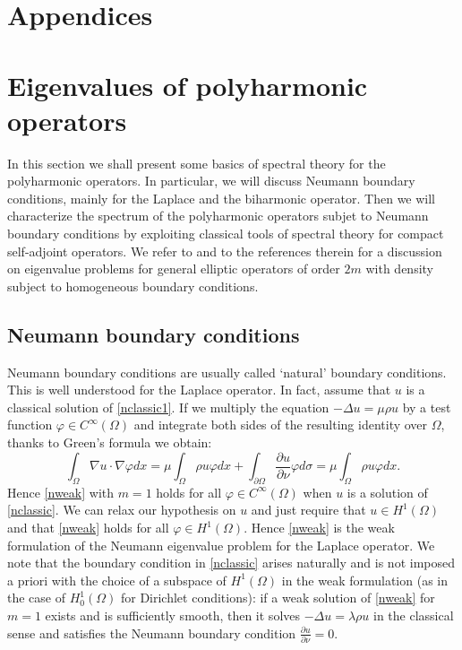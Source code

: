 \documentclass[11pt,a4paper]{amsart}
\numberwithin{equation}{section}
\begin{document}
\appendix
{}
\section*{Appendices}%






\section{Eigenvalues of polyharmonic operators}%

In this section we shall present some basics of spectral theory for the polyharmonic operators. In particular, we will discuss Neumann boundary conditions, mainly for the Laplace and the biharmonic operator. Then we will characterize the spectrum of the polyharmonic operators subjet to Neumann boundary conditions by exploiting classical tools of spectral theory for compact self-adjoint operators. We refer to \cite{egorov,laproeurasian} and to the references therein for a discussion on eigenvalue problems for general elliptic operators of order $2m$ with density subject to homogeneous boundary conditions. 

\subsection{Neumann boundary conditions}\label{app:neumann}
Neumann boundary conditions are usually called `natural' boundary conditions. This is well understood for the Laplace operator. In fact, assume that $u$ is a classical solution of \eqref{nclassic1}. If we multiply the equation $-\Delta u=\mu\rho u$ by a test function $\varphi\in C^{\infty}(\Omega)$ and integrate both sides of the resulting identity over $\Omega$, thanks to Green's formula we obtain:
$$
\int_{\Omega}\nabla u\cdot\nabla\varphi dx=\mu\int_{\Omega}\rho u\varphi dx+\int_{\partial\Omega}\frac{\partial u}{\partial\nu}\varphi d\sigma=\mu\int_{\Omega}\rho u\varphi dx.
$$
Hence \eqref{nweak} with $m=1$ holds for all $\varphi\in C^{\infty}(\Omega)$ when $u$ is a solution of \eqref{nclassic}. We can relax our hypothesis on $u$ and just require that $u\in H^1(\Omega)$ and that \eqref{nweak} holds for all $\varphi\in H^1(\Omega)$. Hence \eqref{nweak} is the weak formulation of the Neumann eigenvalue problem for the Laplace operator. We note that the boundary condition in \eqref{nclassic} arises naturally and is not imposed a priori with the choice of a subspace of $H^1(\Omega)$ in the weak formulation (as in the case of $H^1_0(\Omega)$ for Dirichlet conditions): if a weak solution of \eqref{nweak} for $m=1$ exists and is sufficiently smooth, then it solves $-\Delta u=\lambda\rho u$ in the classical sense and satisfies the Neumann boundary condition $\frac{\partial u}{\partial\nu}=0$.
\end{document}
